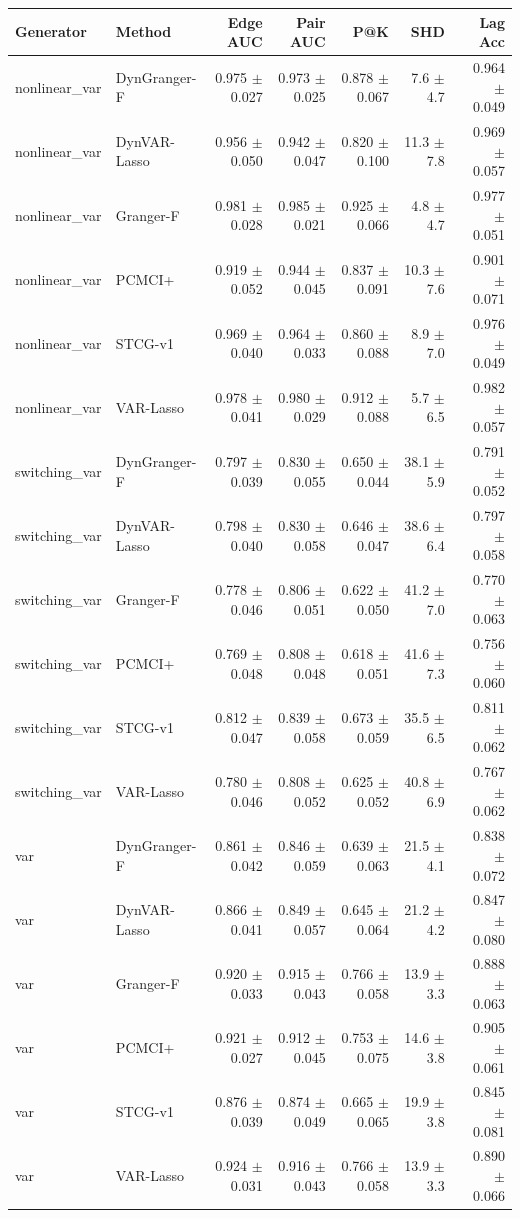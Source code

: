 \begin{tabular}{llrrrrr}
\toprule
Generator & Method & Edge AUC & Pair AUC & P@K & SHD & Lag Acc \\
\midrule
nonlinear_var & DynGranger-F & 0.975 $\pm$ 0.027 & 0.973 $\pm$ 0.025 & 0.878 $\pm$ 0.067 & 7.6 $\pm$ 4.7 & 0.964 $\pm$ 0.049 \\
nonlinear_var & DynVAR-Lasso & 0.956 $\pm$ 0.050 & 0.942 $\pm$ 0.047 & 0.820 $\pm$ 0.100 & 11.3 $\pm$ 7.8 & 0.969 $\pm$ 0.057 \\
nonlinear_var & Granger-F & 0.981 $\pm$ 0.028 & 0.985 $\pm$ 0.021 & 0.925 $\pm$ 0.066 & 4.8 $\pm$ 4.7 & 0.977 $\pm$ 0.051 \\
nonlinear_var & PCMCI+ & 0.919 $\pm$ 0.052 & 0.944 $\pm$ 0.045 & 0.837 $\pm$ 0.091 & 10.3 $\pm$ 7.6 & 0.901 $\pm$ 0.071 \\
nonlinear_var & STCG-v1 & 0.969 $\pm$ 0.040 & 0.964 $\pm$ 0.033 & 0.860 $\pm$ 0.088 & 8.9 $\pm$ 7.0 & 0.976 $\pm$ 0.049 \\
nonlinear_var & VAR-Lasso & 0.978 $\pm$ 0.041 & 0.980 $\pm$ 0.029 & 0.912 $\pm$ 0.088 & 5.7 $\pm$ 6.5 & 0.982 $\pm$ 0.057 \\
switching_var & DynGranger-F & 0.797 $\pm$ 0.039 & 0.830 $\pm$ 0.055 & 0.650 $\pm$ 0.044 & 38.1 $\pm$ 5.9 & 0.791 $\pm$ 0.052 \\
switching_var & DynVAR-Lasso & 0.798 $\pm$ 0.040 & 0.830 $\pm$ 0.058 & 0.646 $\pm$ 0.047 & 38.6 $\pm$ 6.4 & 0.797 $\pm$ 0.058 \\
switching_var & Granger-F & 0.778 $\pm$ 0.046 & 0.806 $\pm$ 0.051 & 0.622 $\pm$ 0.050 & 41.2 $\pm$ 7.0 & 0.770 $\pm$ 0.063 \\
switching_var & PCMCI+ & 0.769 $\pm$ 0.048 & 0.808 $\pm$ 0.048 & 0.618 $\pm$ 0.051 & 41.6 $\pm$ 7.3 & 0.756 $\pm$ 0.060 \\
switching_var & STCG-v1 & 0.812 $\pm$ 0.047 & 0.839 $\pm$ 0.058 & 0.673 $\pm$ 0.059 & 35.5 $\pm$ 6.5 & 0.811 $\pm$ 0.062 \\
switching_var & VAR-Lasso & 0.780 $\pm$ 0.046 & 0.808 $\pm$ 0.052 & 0.625 $\pm$ 0.052 & 40.8 $\pm$ 6.9 & 0.767 $\pm$ 0.062 \\
var & DynGranger-F & 0.861 $\pm$ 0.042 & 0.846 $\pm$ 0.059 & 0.639 $\pm$ 0.063 & 21.5 $\pm$ 4.1 & 0.838 $\pm$ 0.072 \\
var & DynVAR-Lasso & 0.866 $\pm$ 0.041 & 0.849 $\pm$ 0.057 & 0.645 $\pm$ 0.064 & 21.2 $\pm$ 4.2 & 0.847 $\pm$ 0.080 \\
var & Granger-F & 0.920 $\pm$ 0.033 & 0.915 $\pm$ 0.043 & 0.766 $\pm$ 0.058 & 13.9 $\pm$ 3.3 & 0.888 $\pm$ 0.063 \\
var & PCMCI+ & 0.921 $\pm$ 0.027 & 0.912 $\pm$ 0.045 & 0.753 $\pm$ 0.075 & 14.6 $\pm$ 3.8 & 0.905 $\pm$ 0.061 \\
var & STCG-v1 & 0.876 $\pm$ 0.039 & 0.874 $\pm$ 0.049 & 0.665 $\pm$ 0.065 & 19.9 $\pm$ 3.8 & 0.845 $\pm$ 0.081 \\
var & VAR-Lasso & 0.924 $\pm$ 0.031 & 0.916 $\pm$ 0.043 & 0.766 $\pm$ 0.058 & 13.9 $\pm$ 3.3 & 0.890 $\pm$ 0.066 \\
\bottomrule
\end{tabular}
